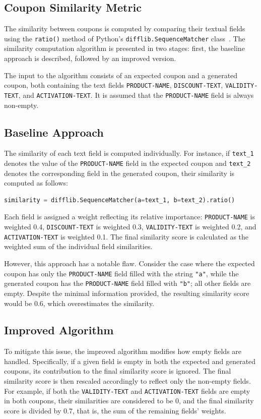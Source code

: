 \documentclass[licencjacka,en]{pracamgr}
\begin{document}
\begin{appendices}
\chapter{Coupon Similarity Metric} \label{AppE}
The similarity between coupons is computed by comparing their textual fields using the \texttt{ratio()} method of Python's \texttt{difflib.SequenceMatcher} class~\cite{python-difflib}. The similarity computation algorithm is presented in two stages: first, the baseline approach is described, followed by an improved version. 

The input to the algorithm consists of an expected coupon and a generated coupon, both containing the text fields \texttt{PRODUCT-NAME}, \texttt{DISCOUNT-TEXT}, \texttt{VALIDITY-TEXT}, and \texttt{ACTIVATION-TEXT}. It is assumed that the \texttt{PRODUCT-NAME} field is always non-empty.

\section{Baseline Approach}
The similarity of each text field is computed individually. For instance, if \texttt{text\_1} denotes the value of the \texttt{PRODUCT-NAME} field in the expected coupon and \texttt{text\_2} denotes the corresponding field in the generated coupon, their similarity is computed as follows:

\begin{lstlisting}[language=Python]
similarity = difflib.SequenceMatcher(a=text_1, b=text_2).ratio()
\end{lstlisting}

Each field is assigned a weight reflecting its relative importance: \texttt{PRODUCT-NAME} is weighted 0.4, \texttt{DISCOUNT-TEXT} is weighted 0.3, \texttt{VALIDITY-TEXT} is weighted 0.2, and \texttt{ACTIVATION-TEXT} is weighted 0.1. The final similarity score is calculated as the weighted sum of the individual field similarities.

However, this approach has a notable flaw. Consider the case where the expected coupon has only the \texttt{PRODUCT-NAME} field filled with the string \texttt{"a"}, while the generated coupon has the \texttt{PRODUCT-NAME} field filled with \texttt{"b"}; all other fields are empty. Despite the minimal information provided, the resulting similarity score would be 0.6, which overestimates the similarity.

\section{Improved Algorithm}
To mitigate this issue, the improved algorithm modifies how empty fields are handled. Specifically, if a given field is empty in both the expected and generated coupons, its contribution to the final similarity score is ignored. The final similarity score is then rescaled accordingly to reflect only the non-empty fields. For example, if both the \texttt{VALIDITY-TEXT} and \texttt{ACTIVATION-TEXT} fields are empty in both coupons, their similarities are considered to be 0, and the final similarity score is divided by 0.7, that is, the sum of the remaining fields' weights.


\end{appendices}
\end{document}
